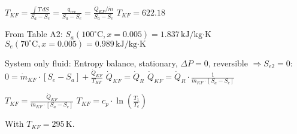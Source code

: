 \( T_{KF} = \frac{\int T \, dS}{S_a - S_e} = \frac{q_{rev}}{S_a - S_e} = \frac{\dot{Q}_{KF}/\dot{m}}{S_a - S_e} \)  
\( T_{KF} = 622.18 \)  

From Table A2:  
\( S_a (100^\circ \text{C}, x = 0.005) = 1.837 \, \text{kJ/kg·K} \)  
\( S_e (70^\circ \text{C}, x = 0.005) = 0.989 \, \text{kJ/kg·K} \)  

System only fluid:  
Entropy balance, stationary, \( \Delta P = 0 \), reversible \( \Rightarrow S_{e2} = 0 \):  
\( 0 = \dot{m}_{KF} \cdot [S_e - S_a] + \frac{\dot{Q}_{KF}}{T_{KF}} \)  
\( \dot{Q}_{KF} = \dot{Q}_R \)  
\( \dot{Q}_{KF} = \dot{Q}_R \cdot \frac{1}{\dot{m}_{KF} \cdot [S_a - S_e]} \)  

\( T_{KF} = \frac{\dot{Q}_{KF}}{\dot{m}_{KF} \cdot [S_a - S_e]} \)  
\( T_{KF} = c_p \cdot \ln \left( \frac{T_1}{T_e} \right) \)  

With \( T_{KF} = 295 \, \text{K} \).